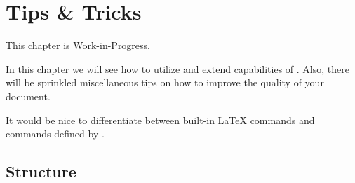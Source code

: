 \chapter{Tips \& Tricks} \label{ch:Tips}

\begin{Note}
    This chapter is Work-in-Progress.
\end{Note}

In this chapter we will see how to utilize and extend capabilities of \TeXtured{}.
Also, there will be sprinkled miscellaneous tips on how to improve the quality of your document.

\begin{Suggestion}[TODO]
    It would be nice to differentiate between built-in \LaTeX{} commands and commands defined by \TeXtured{}.
\end{Suggestion}

\section{Structure}%
\label{sec:Structure}

